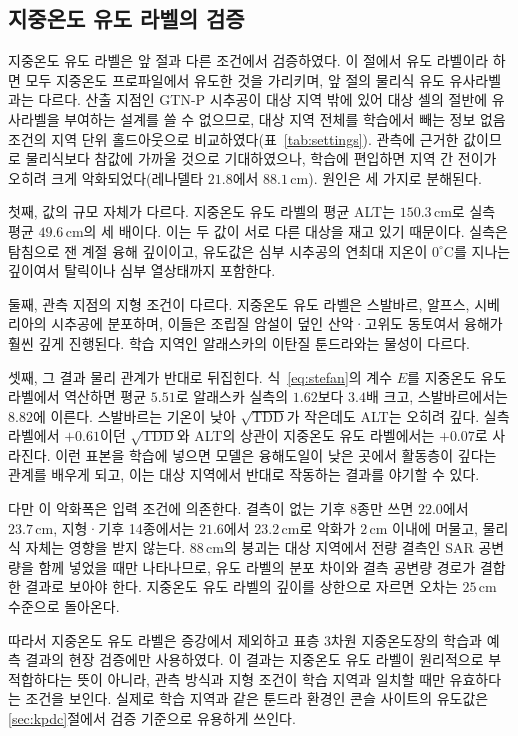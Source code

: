 \documentclass[10pt,twocolumn]{article}
\begin{document}
\subsection{지중온도 유도 라벨의 검증}
\label{sec:derived}
지중온도 유도 라벨은 앞 절과 다른 조건에서 검증하였다. 이 절에서 유도 라벨이라 하면 모두 지중온도 프로파일에서 유도한 것을 가리키며, 앞 절의 물리식 유도 유사라벨과는 다르다. 산출 지점인 GTN-P 시추공이 대상 지역 밖에 있어 대상 셀의 절반에 유사라벨을 부여하는 설계를 쓸 수 없으므로, 대상 지역 전체를 학습에서 빼는 정보 없음 조건의 지역 단위 홀드아웃으로 비교하였다(표~\ref{tab:settings}). 관측에 근거한 값이므로 물리식보다 참값에 가까울 것으로 기대하였으나, 학습에 편입하면 지역 간 전이가 오히려 크게 악화되었다(레나델타 $21.8$에서 $88.1\,\mathrm{cm}$). 원인은 세 가지로 분해된다.

첫째, 값의 규모 자체가 다르다. 지중온도 유도 라벨의 평균 ALT는 $150.3\,\mathrm{cm}$로 실측 평균 $49.6\,\mathrm{cm}$의 세 배이다. 이는 두 값이 서로 다른 대상을 재고 있기 때문이다. 실측은 탐침으로 잰 계절 융해 깊이이고, 유도값은 심부 시추공의 연최대 지온이 $0^\circ\mathrm{C}$를 지나는 깊이여서 탈릭이나 심부 열상태까지 포함한다.

둘째, 관측 지점의 지형 조건이 다르다. 지중온도 유도 라벨은 스발바르, 알프스, 시베리아의 시추공에 분포하며, 이들은 조립질 암설이 덮인 산악·고위도 동토여서 융해가 훨씬 깊게 진행된다. 학습 지역인 알래스카의 이탄질 툰드라와는 물성이 다르다.

셋째, 그 결과 물리 관계가 반대로 뒤집힌다. 식~\eqref{eq:stefan}의 계수 $E$를 지중온도 유도 라벨에서 역산하면 평균 $5.51$로 알래스카 실측의 $1.62$보다 $3.4$배 크고, 스발바르에서는 $8.82$에 이른다. 스발바르는 기온이 낮아 $\sqrt{\mathrm{TDD}}$가 작은데도 ALT는 오히려 깊다. 실측 라벨에서 $+0.61$이던 $\sqrt{\mathrm{TDD}}$와 ALT의 상관이 지중온도 유도 라벨에서는 $+0.07$로 사라진다. 이런 표본을 학습에 넣으면 모델은 융해도일이 낮은 곳에서 활동층이 깊다는 관계를 배우게 되고, 이는 대상 지역에서 반대로 작동하는 결과를 야기할 수 있다.

다만 이 악화폭은 입력 조건에 의존한다. 결측이 없는 기후 8종만 쓰면 $22.0$에서 $23.7\,\mathrm{cm}$, 지형·기후 14종에서는 $21.6$에서 $23.2\,\mathrm{cm}$로 악화가 $2\,\mathrm{cm}$ 이내에 머물고, 물리식 자체는 영향을 받지 않는다. $88\,\mathrm{cm}$의 붕괴는 대상 지역에서 전량 결측인 SAR 공변량을 함께 넣었을 때만 나타나므로, 유도 라벨의 분포 차이와 결측 공변량 경로가 결합한 결과로 보아야 한다. 지중온도 유도 라벨의 깊이를 상한으로 자르면 오차는 $25\,\mathrm{cm}$ 수준으로 돌아온다.

따라서 지중온도 유도 라벨은 증강에서 제외하고 표층 3차원 지중온도장의 학습과 예측 결과의 현장 검증에만 사용하였다. 이 결과는 지중온도 유도 라벨이 원리적으로 부적합하다는 뜻이 아니라, 관측 방식과 지형 조건이 학습 지역과 일치할 때만 유효하다는 조건을 보인다. 실제로 학습 지역과 같은 툰드라 환경인 콘슬 사이트의 유도값은 \ref{sec:kpdc}절에서 검증 기준으로 유용하게 쓰인다.
\end{document}
